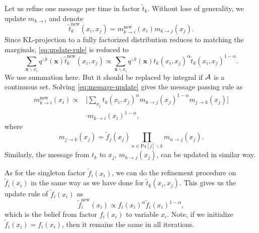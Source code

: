 \documentclass{article}
\begin{document}
Let us refine one message per time in factor $\tilde{t}_k$. Without lose of generality, we update $m_{k\rightarrow i}$ and denote
\begin{equation}
  \tilde{t}_k^{\text{new}}(x_i, x_j) = m_{k\rightarrow i}^{\text{new}}(x_i) m_{k\rightarrow j}(x_j).
\end{equation}
Since KL-projection to a fully factorized distribution reduces to matching the marginals, \autoref{eq:update-rule} is reduced to
\begin{equation}\label{eq:message-update}
  \sum_{\bm{x}\backslash x_i} q^{\backslash k}(\bm{x}) \tilde{t}_k^{\text{new}}(x_i, x_j) \propto \sum_{\bm{x}\backslash x_i} q^{\backslash k}(\bm{x}) t_k(x_i, x_j)^{\alpha} \tilde{t}_k(x_i, x_j)^{1-\alpha}.
\end{equation}
We use summation here. But it should be replaced by integral if $\mathcal{A}$ is a continuous set.
Solving \autoref{eq:message-update} gives the message passing rule as
\begin{align}\label{eq:message-rule}
  {m}^{\text{new}}_{k\rightarrow i}(x_i) \propto & \bigg[ \sum_{x_j} t_k(x_i, x_j)^{\alpha} {m}_{k\rightarrow j}(x_j)^{1-\alpha} m_{j \rightarrow k}(x_j) \bigg] \nonumber \\
                                                 &\cdot m_{k\rightarrow i}(x_i)^{1-\alpha},
\end{align}
where
\begin{equation}
  m_{j \rightarrow k}(x_j) = \tilde{f}_j(x_j) \prod_{n \in \text{Pa}[j] \backslash k} m_{n \rightarrow j}(x_j).
\end{equation}
Similarly, the message from $t_k$ to $x_j$, $m_{k \rightarrow j}(x_j)$, can be updated in similar way.

As for the singleton factor $\tilde{f}_i(x_i)$, we can do the refinement procedure on $\tilde{f}_i(x_i)$ in the same way as we have done for $\tilde{t}_k(x_i, x_j)$. This gives us the update rule of $\tilde{f}_i(x_i)$ as
\begin{equation}\label{eq:fix-factor-update}
  \tilde{f}_i^{\text{new}}(x_i) \propto f_i(x_i)^{\alpha} \tilde{f}_i(x_i)^{1-\alpha},
\end{equation}
which is the belief from factor $f_i(x_i)$ to variable $x_i$. Note, if we initialize $\tilde{f}_i(x_i) = f_i(x_i)$, then it remains the same in all iterations.
\end{document}
